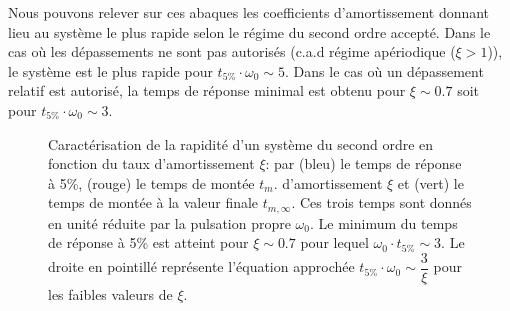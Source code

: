 Nous pouvons relever sur ces abaques les coefficients d'amortissement donnant
lieu au système le plus rapide selon le régime du second ordre accepté.
Dans le cas où les dépassements ne sont pas autorisés (c.a.d régime 
apériodique ($\xi>1$)), le système est le plus rapide pour 
$t_{5\%}\cdot\omega_0\sim5$. Dans le cas où un dépassement relatif est 
autorisé, la temps de réponse minimal est obtenu pour $\xi\sim 0.7$ soit
pour $t_{5\%}\cdot\omega_0\sim3$.

\begin{figure}
\centering
{}
\caption{Caractérisation de la rapidité d'un système du second ordre en
         fonction du taux d'amortissement $\xi$: par
         (bleu) le temps de réponse à 5\%,  
         (rouge) le temps de montée $t_m$.
         d'amortissement $\xi$ et (vert) le temps de montée à la valeur 
         finale $t_{m,\infty}$. 
         Ces trois temps sont donnés en unité réduite
         par la pulsation propre $\omega_0$.
         Le minimum du temps de réponse à 5\% est atteint pour $\xi\sim0.7$ 
         pour lequel $\omega_0\cdot t_{5\%}\sim3$.
         Le droite en pointillé représente l'équation approchée 
         $t_{5\%}\cdot\omega_0\sim\dfrac{3}{\xi}$ pour les faibles valeurs de 
         $\xi$.
         \label{fig-2nd_temps_reponse_2}}
\end{figure}

